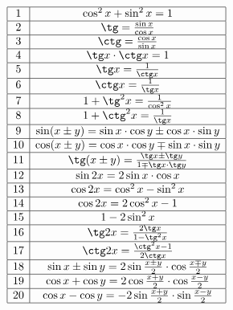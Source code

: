 \documentclass{article}
\begin{document}
\begin{displaymath}
\begin{array}{|c|c|}

  \hline
  1 &\cos^2 x + \sin^2 x = 1\\
  \hline
  2 &\tg = \frac{\sin x}{\cos x}\\
  \hline
  3 &\ctg = \frac{\cos x}{\sin x}\\
  \hline
  4 &\tg x \cdot \ctg x = 1\\
  \hline
  5 &\tg x = \frac{1}{\ctg x}\\
  \hline
  6 &\ctg x = \frac{1}{\tg x}\\
  \hline
  7 &1 + \tg^2 x = \frac{1}{\cos^2 x}\\
  \hline
  8 &1 + \ctg^2 x = \frac{1}{\tg x}\\
  \hline
  9 &\sin (x\pm y) = \sin x \cdot \cos y \pm \cos x \cdot \sin y\\
  \hline
  10&\cos (x\pm y) = \cos x \cdot \cos y \mp \sin x \cdot \sin y\\
  \hline
  11&\tg (x\pm y) = \frac{\tg x \pm \tg y}{1 \mp \tg x \cdot \tg y}\\
  \hline
  12&\sin 2x = 2\sin x \cdot \cos x\\
  \hline
  13&\cos 2x = \cos^2 x - \sin^2 x\\
  \hline
  14&\cos 2x = 2\cos^2 x - 1\\
  \hline
  15&1 - 2\sin^2 x\\
  \hline
  16&\tg 2x = \frac{2\tg x}{1 - \tg^2 x}\\
  \hline 
  17&\ctg 2x = \frac{\ctg^2 x - 1}{2\ctg x}\\
  \hline
  18&\sin x \pm \sin y = 2\sin \frac{x\pm y}{2} \cdot \cos \frac{x\mp y}{2}\\
  \hline
  19&\cos x + \cos y = 2\cos\frac{x + y}{2} \cdot \cos\frac{x - y}{2}\\
  \hline
  20&\cos x - \cos y = -2\sin\frac{x + y}{2} \cdot \sin\frac{x - y}{2}\\
  \hline

\end{array} 
\end{displaymath}
\end{document}
